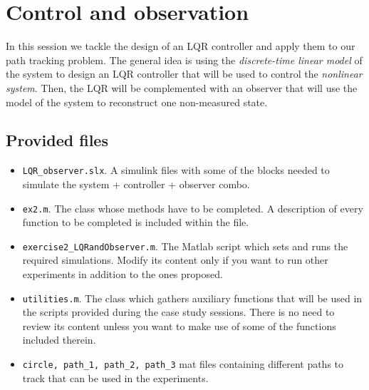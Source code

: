 \setcounter{chapter}{1}
\chapter{Control and observation}
In this session we tackle the design of an LQR controller and apply them to our path tracking problem.
The general idea is using the \emph{discrete-time linear model} of the system to design an LQR controller that will be used to control the \emph{nonlinear system}. 
Then, the LQR will be complemented with an observer that will use the model of the system to reconstruct one non-measured state. 

%
\section{Provided files}
\begin{itemize}
	\setlength\itemsep{0em}
	\item \texttt{LQR\_observer.slx}.
		A simulink files with some of the blocks needed to simulate the system + controller + observer combo.
	\item \texttt{ex2.m}.
		The class whose methods have to be completed.
		A description of every function to be completed is included within the file.
	\item \texttt{exercise2\_LQRandObserver.m}.
		The Matlab script which sets and runs the required simulations.
		Modify its content only if you want to run other experiments in addition to the ones proposed.


	\item \texttt{utilities.m}.
		The class which gathers auxiliary functions that will be used in the scripts provided during the case study sessions.
		There is no need to review its content unless you want to make use of some of the functions included therein.
	\item \texttt{circle, path\_1, path\_2, path\_3} mat files containing different paths to track that can be used in the experiments.
\end{itemize}



